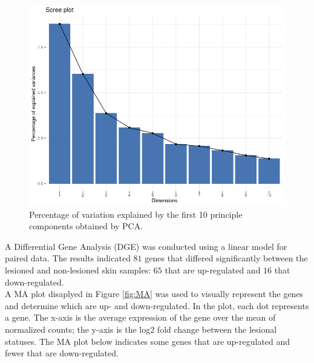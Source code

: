 \documentclass[journal, a4paper]{IEEEtran}
\begin{document}
\begin{figure}[!htp]
    \begin{center}
    \begin{minipage}{0.5 \textwidth}
      \centering
      \includegraphics[width=\textwidth]{scree-plot.png}
      \caption{Percentage of variation explained by the first 10 principle components obtained by PCA.}
      \label{fig:scree-plot}
    \end{minipage}
  \end{center}
\end{figure}

A Differential Gene Analysis (DGE) was conducted using a linear model for paired data. The results indicated $81$ genes that differed significantly between the lesioned and non-lesioned skin samples: $65$ that are up-regulated and $16$ that down-regulated.\\%

A MA plot disaplyed in Figure \ref{fig:MA} was used to visually represent the genes and determine which are up- and down-regulated. In the plot, each dot represents a gene. The x-axis is the average expression of the gene over the mean of normalized counts; the y-axis is the log2 fold change between the lesional statuses. The MA plot below indicates some genes that are up-regulated and fewer that are down-regulated.\\
\end{document}
